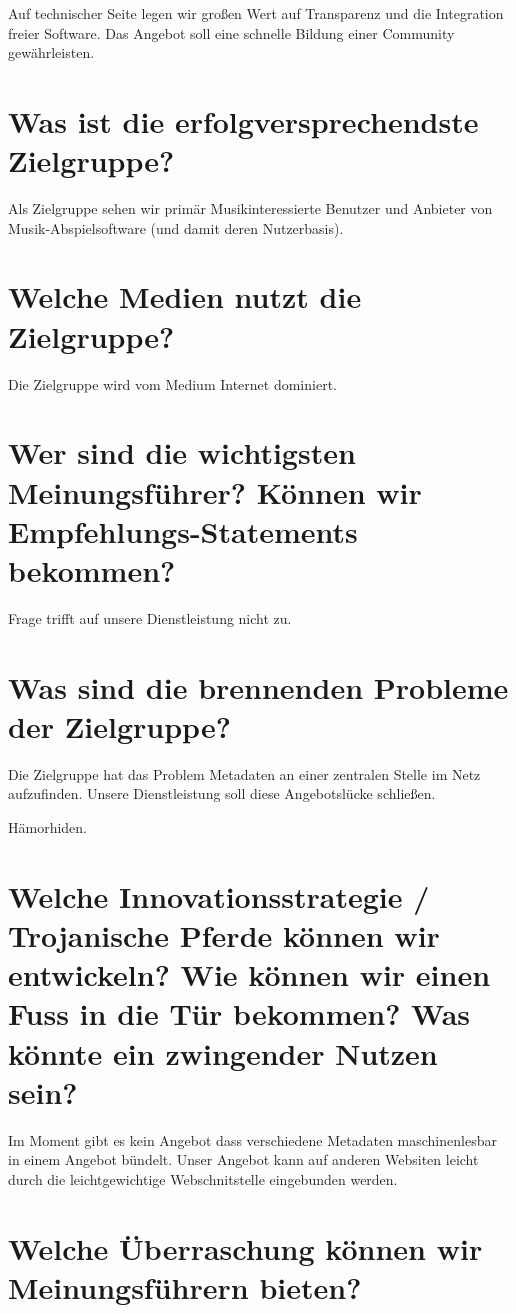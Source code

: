 \documentclass[11pt]{scrreprt}
\begin{document}
Auf technischer Seite legen wir großen Wert auf Transparenz und die Integration
freier Software. Das Angebot soll eine schnelle Bildung einer Community
gewährleisten.



\section{Was ist die erfolgversprechendste Zielgruppe?}
Als Zielgruppe sehen wir primär Musikinteressierte Benutzer und Anbieter von
Musik-Abspielsoftware (und damit deren Nutzerbasis).


\section{Welche Medien nutzt die Zielgruppe?}
Die Zielgruppe wird vom Medium Internet dominiert.



\section{Wer sind die wichtigsten Meinungsführer?
Können wir Empfehlungs-Statements bekommen?}
Frage trifft auf unsere Dienstleistung nicht zu.



\section{Was sind die brennenden Probleme der
Zielgruppe?}
Die Zielgruppe hat das Problem Metadaten an einer zentralen Stelle im Netz
aufzufinden. Unsere Dienstleistung soll diese Angebotslücke schließen.


Hämorhiden.

\section{Welche Innovationsstrategie / Trojanische
Pferde können wir entwickeln?
Wie können wir einen Fuss in die Tür
bekommen?
Was könnte ein zwingender Nutzen sein?}
Im Moment gibt es kein Angebot dass verschiedene Metadaten maschinenlesbar 
in einem Angebot bündelt. Unser Angebot kann auf anderen Websiten leicht durch
die leichtgewichtige Webschnitstelle eingebunden werden.


\section{Welche Überraschung können wir
Meinungsführern bieten?}
\end{document}
